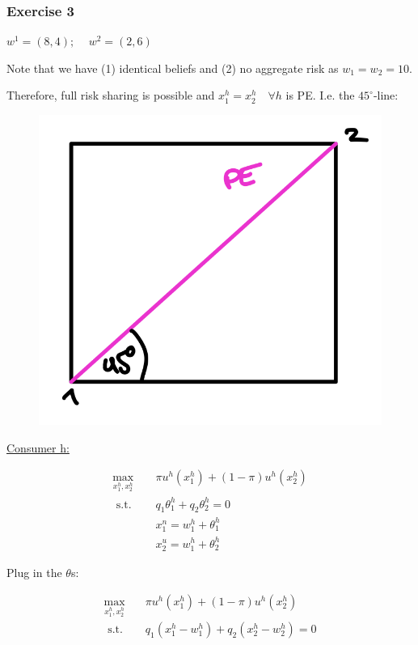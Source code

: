 {
\subsubsection*{Exercise 3}

$w^1=(8,4) \text {; } \quad w^2=(2,6)$

\begin{enumerate}[label=(\alph*)]
{\item 
Note that we have (1) identical beliefs
and (2) no aggregate risk as $w_{1}=w_{2}=10$.

Therefore, full risk sharing is possible and $x_{1}^{h}=x_{2}^{h} \quad \forall h$ is PE. I.e. the $45^{\circ}$-line:

\begin{figure}[!h]
    \centering
    \includegraphics[width=.75\textwidth]{images/2014_15_3.png}
\end{figure}
}
{\item 
\underline{Consumer h:}

\begin{align*}
    \max_{x_{1}^{h}, x_{2}^{h}} \quad & \pi u^{h}\left(x_{1}^{h}\right)+(1-\pi) u^{h}\left(x_{2}^{h}\right) \\
    \text { s.t. } \quad & q_{1} \theta_{1}^{h}+q_{2} \theta_{2}^{h}=0 \\
    & x_{1}^{n}=w_{1}^{h}+\theta_{1}^{h} \\
    & x_{2}^{u}=w_{1}^{h}+\theta_{2}^{h}
\end{align*}

Plug in the $\theta$s:

\begin{align*}
    \max _{x_{1}^{h}, x_{2}^{h}} \quad & \pi u^{h}\left(x_{1}^{h}\right)+(1-\pi) u^{h}\left(x_{2}^{h}\right) \\
    \text { s.t. } & q_{1}\left(x_{1}^{h}-w_{1}^{h}\right)+q_{2}\left(x_{2}^{h}-w_{2}^{h}\right)=0
\end{align*}

}
\end{enumerate}}
